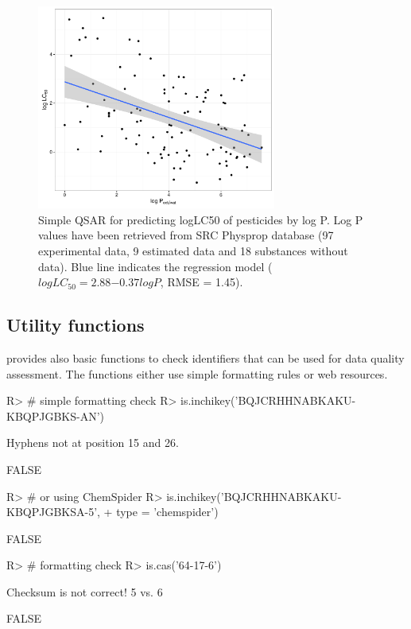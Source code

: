 \documentclass[article, shortnames]{jss}\usepackage[]{graphicx}\usepackage[]{color}
\begin{document}
\begin{figure}[ht]
\begin{CodeChunk}


{\centering \includegraphics[width=0.7\textwidth]{plot_qsar-1} 

}

\end{CodeChunk}
\caption{Simple QSAR for predicting logLC50 of pesticides by log P. 
Log P values have been retrieved from SRC Physprop database (97 experimental data, 9 estimated data and 18 substances without data). 
Blue line indicates the regression model ($log LC_{50} = 2.88\ensuremath{-0.37} logP$, RMSE = 1.45).}
\label{fig:fig3}
\end{figure}


\subsection[Utility functions]{Utility functions}
 provides also basic functions to check identifiers that can be used for data quality assessment.
The functions either use simple formatting rules or web resources.

\begin{CodeChunk}
\begin{CodeInput}
R> # simple formatting check
R> is.inchikey('BQJCRHHNABKAKU-KBQPJGBKS-AN')
\end{CodeInput}
\begin{CodeOutput}
Hyphens not at position 15 and 26.
\end{CodeOutput}
\begin{CodeOutput}
[1] FALSE
\end{CodeOutput}
\begin{CodeInput}
R> # or using ChemSpider
R> is.inchikey('BQJCRHHNABKAKU-KBQPJGBKSA-5', 
+        type = 'chemspider')
\end{CodeInput}
\begin{CodeOutput}
[1] FALSE
\end{CodeOutput}
\begin{CodeInput}
R> # formatting check
R> is.cas('64-17-6')
\end{CodeInput}
\begin{CodeOutput}
Checksum is not correct! 5 vs. 6
\end{CodeOutput}
\begin{CodeOutput}
[1] FALSE
\end{CodeOutput}
\end{CodeChunk}
\end{document}
